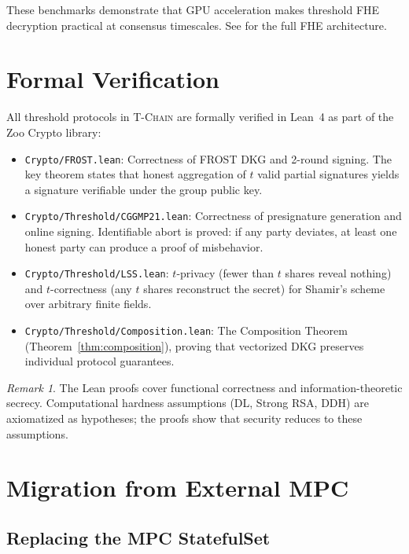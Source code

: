 \documentclass[11pt,letterpaper]{article}
\theoremstyle{definition}
\theoremstyle{remark}
\newtheorem{remark}{Remark}
\newcommand{\TChain}{\textsc{T-Chain}}
\begin{document}
These benchmarks demonstrate that GPU acceleration makes threshold FHE decryption practical at consensus timescales. See \cite{zoo-fhe} for the full FHE architecture.

\section{Formal Verification}
\label{sec:formal}

All threshold protocols in \TChain{} are formally verified in Lean~4 as part of the Zoo Crypto library:

\begin{itemize}
\item \texttt{Crypto/FROST.lean}: Correctness of FROST DKG and 2-round signing. The key theorem states that honest aggregation of $t$ valid partial signatures yields a signature verifiable under the group public key.
\item \texttt{Crypto/Threshold/CGGMP21.lean}: Correctness of presignature generation and online signing. Identifiable abort is proved: if any party deviates, at least one honest party can produce a proof of misbehavior.
\item \texttt{Crypto/Threshold/LSS.lean}: $t$-privacy (fewer than $t$ shares reveal nothing) and $t$-correctness (any $t$ shares reconstruct the secret) for Shamir's scheme over arbitrary finite fields.
\item \texttt{Crypto/Threshold/Composition.lean}: The Composition Theorem (Theorem~\ref{thm:composition}), proving that vectorized DKG preserves individual protocol guarantees.
\end{itemize}

\begin{remark}
The Lean proofs cover functional correctness and information-theoretic secrecy. Computational hardness assumptions (DL, Strong RSA, DDH) are axiomatized as hypotheses; the proofs show that security reduces to these assumptions.
\end{remark}

\section{Migration from External MPC}
\label{sec:migration}

\subsection{Replacing the MPC StatefulSet}
\end{document}
